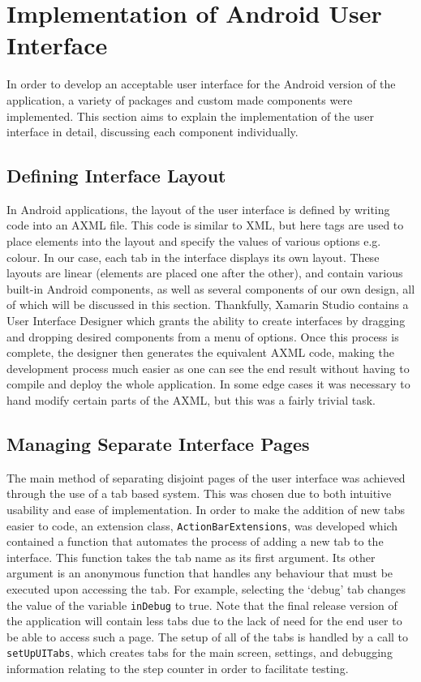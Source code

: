 \documentclass[12pt,a4paper]{report}
\begin{document}
    \section{Implementation of Android User Interface}
        In order to develop an acceptable user interface for the Android version of the application, a variety of packages and custom made
        components were implemented. This section aims to explain the implementation of the user interface in detail, discussing each component
        individually.
        \subsection{Defining Interface Layout}
	        In Android applications, the layout of the user interface is defined by writing code into an AXML file. This code is similar to XML, but here tags are used to place elements into the layout and specify the values of various options e.g. colour.
           In our case, each tab in the interface displays its own layout.
            These layouts are linear (elements are placed one after the other), and contain various built-in Android components, as well
            as several components of our own design, all of which will be discussed in this section. Thankfully, Xamarin Studio contains a 
            User Interface Designer which grants the ability to create interfaces by dragging and dropping desired components from a menu
            of options. Once this process is complete, the designer then generates the equivalent AXML code, making the development process
            much easier as one can see the end result without having to compile and deploy the whole application. In some edge cases it was necessary
            to hand modify certain parts of the AXML, but this was a fairly trivial task.
        \subsection{Managing Separate Interface Pages}
            The main method of separating disjoint pages of the user interface was achieved through the use of a tab based system. This was chosen due
            to both intuitive usability and ease of implementation. In order to make the addition of new tabs easier to code, an extension class,
            \texttt{ActionBarExtensions}, was developed which contained a function that automates the process of adding a new tab to the
            interface. This function takes the tab name as its first argument. Its other argument is an anonymous function that handles any behaviour
            that must be executed upon accessing the tab. For example, selecting the `debug' tab changes the value of the variable \texttt{inDebug} to
            true. Note that the final release version of the application will contain less tabs due to the lack of need for the end user to be able to access
            such a page. The setup of all of the tabs is handled by a call to \texttt{setUpUITabs}, which creates tabs for the main screen, settings, and 
            debugging information relating to the step counter in order to facilitate testing.
\end{document}
